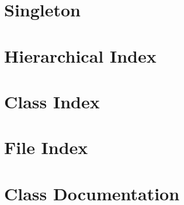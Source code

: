 \let\mypdfximage\pdfximage\def\pdfximage{\immediate\mypdfximage}\documentclass[twoside]{book}
\newcommand{\+}{\discretionary{\mbox{\scriptsize$\hookleftarrow$}}{}{}}
\begin{document}
\chapter{Singleton}
\label{md__d_1__g_i_t__practice__design_patterns__singleton__r_e_a_d_m_e}

\chapter{Hierarchical Index}

\chapter{Class Index}

\chapter{File Index}

\chapter{Class Documentation}























\end{document}
